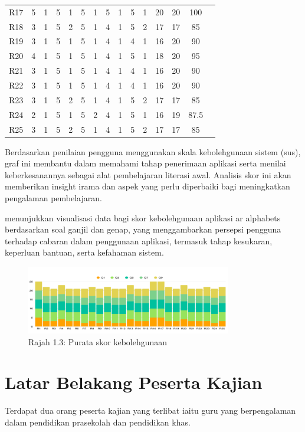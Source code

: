{{\begin{longtable}{|c|c|c|c|c|c|c|c|c|c|c|c|c|c|c|}
R17 & 5 & 1 & 5 & 1 & 5 & 1 & 5 & 1 & 5 & 1 & 20 & 20 & 100 \\
R18 & 3 & 1 & 5 & 2 & 5 & 1 & 4 & 1 & 5 & 2 & 17 & 17 & 85 \\
R19 & 3 & 1 & 5 & 1 & 5 & 1 & 4 & 1 & 4 & 1 & 16 & 20 & 90 \\
R20 & 4 & 1 & 5 & 1 & 5 & 1 & 4 & 1 & 5 & 1 & 18 & 20 & 95 \\
R21 & 3 & 1 & 5 & 1 & 5 & 1 & 4 & 1 & 4 & 1 & 16 & 20 & 90 \\
R22 & 3 & 1 & 5 & 1 & 5 & 1 & 4 & 1 & 4 & 1 & 16 & 20 & 90 \\
R23 & 3 & 1 & 5 & 2 & 5 & 1 & 4 & 1 & 5 & 2 & 17 & 17 & 85 \\
R24 & 2 & 1 & 5 & 1 & 5 & 2 & 4 & 1 & 5 & 1 & 16 & 19 & 87.5 \\
R25 & 3 & 1 & 5 & 2 & 5 & 1 & 4 & 1 & 5 & 2 & 17 & 17 & 85 \\
\end{longtable}


Berdasarkan penilaian pengguna menggunakan skala kebolehgunaan sistem (sus), graf ini membantu dalam memahami tahap penerimaan aplikasi serta menilai keberkesanannya sebagai alat pembelajaran literasi awal. Analisis skor ini akan memberikan insight irama dan aspek yang perlu diperbaiki bagi meningkatkan pengalaman pembelajaran.

menunjukkan visualisasi data bagi skor kebolehgunaan aplikasi ar alphabets berdasarkan soal ganjil dan genap, yang menggambarkan persepsi pengguna terhadap cabaran dalam penggunaan aplikasi, termasuk tahap kesukaran, keperluan bantuan, serta kefahaman sistem.

\begin{figure}[h]
\centering
\includegraphics[width=0.8\textwidth]{2.png}
\caption{Rajah 1.3: Purata skor kebolehgunaan}
\end{figure}


\section{Latar Belakang Peserta Kajian}
Terdapat dua orang peserta kajian yang terlibat iaitu guru yang berpengalaman dalam pendidikan prasekolah dan pendidikan khas.

}}

